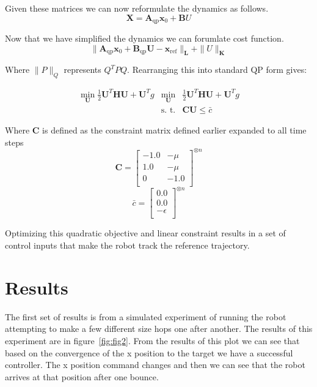\documentclass[conference]{IEEEtran}
\begin{document}
Given these matrices we can now reformulate the dynamics as follows.
\[\mathbf{X} = \mathbf{A}_\text{qp}\mathbf{x}_0 + \mathbf{B}U\]

Now that we have simplified the dynamics we can forumlate cost function.
\[\|\mathbf{A}_\text{qp}\mathbf{x}_0+\mathbf{B}_\text{qp}\mathbf{U}-\mathbf{x}_\text{ref} \|_\mathbf{L} + \|U\|_\mathbf{K}\]

Where \(\|P\|_Q\) represents \(Q^TPQ\).
Rearranging this into standard QP form gives:

\begin{align*}\min\limits_\mathbf{U}\frac12\mathbf{U}^T\mathbf{H}\mathbf{U} + \mathbf{U}^Tg
     & \min\limits_\mathbf{U} & \frac12\mathbf{U}^T\mathbf{H}\mathbf{U} + \mathbf{U}^Tg \\
     & \text{s.  t.}          & \mathbf{CU} \leq \bar{c}
\end{align*}

Where \(\mathbf{C}\) is defined as the constraint matrix defined earlier expanded to all time steps
\[\mathbf{C} = \begin{bmatrix}
        -1.0 & -\mu \\
        1.0  & -\mu \\
        0    & -1.0 \\
    \end{bmatrix}^{\otimes n} \]
\[\bar{c} =  \begin{bmatrix}
        0.0       \\
        0.0       \\
        -\epsilon \\
    \end{bmatrix}^{\otimes n}\]

Optimizing this quadratic objective and linear constraint results in a set of control inputs that make the robot track the reference trajectory.

\section{Results}
\label{sec:results}

The first set of results is from a simulated experiment of running the robot attempting to make a few different size hops one after another.
The results of this experiment are in figure~\ref{fig:fig2}.
From the results of this plot we can see that based on the convergence of the x position to the target we have a successful controller.
The x position command changes and then we can see that the robot arrives at that position after one bounce.
\end{document}
